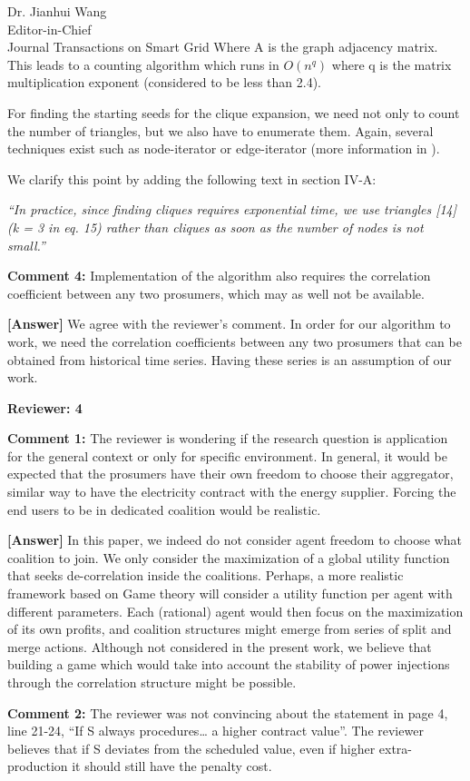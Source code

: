 \documentclass{letter}
\begin{document}
\begin{letter}{Dr. Jianhui Wang \\ Editor-in-Chief \\ Journal Transactions on Smart Grid }
Where A is the graph adjacency matrix. This leads to a counting algorithm which runs in $ O(n^q) $ where q is the matrix multiplication exponent (considered to be less than 2.4).

For finding the starting seeds for the clique expansion, we need not only to count the number of triangles, but we also have to enumerate them. Again, several techniques exist such as node-iterator or edge-iterator (more information in \cite{Schank2001}). 

We clarify this point by adding the following text in section IV-A:

\textit{“In practice, since finding cliques requires exponential time, we use triangles [14] (k = 3 in eq. 15) rather than cliques as soon as the number of nodes is not small.” }


\textbf{Comment 4:} Implementation of the algorithm also requires the correlation coefficient between any two prosumers, which may as well not be available.


\textbf{[Answer]} We agree with the reviewer’s comment. In order for our algorithm to work, we need the correlation coefficients between any two prosumers that can be obtained from historical time series. Having these series is an assumption of our work.


\textbf{Reviewer: 4}

\textbf{Comment 1:} The reviewer is wondering if the research question is application for the general context or only for specific environment. In general, it would be expected that the prosumers have their own freedom to choose their aggregator, similar way to have the electricity contract with the energy supplier. Forcing the end users to be in dedicated coalition would be realistic.


\textbf{[Answer]} In this paper, we indeed do not consider agent freedom to choose what coalition to join. We only consider the maximization of a global utility function that seeks de-correlation inside the coalitions. Perhaps, a more realistic framework based on Game theory will consider a utility function per agent with different parameters. Each (rational) agent would then focus on the maximization of its own profits, and coalition structures might emerge from series of split and merge actions. Although not considered in the present work, we believe that building a game which would take into account the stability of power injections through the correlation structure might be possible.


\textbf{Comment 2:} The reviewer was not convincing about the statement in page 4, line 21-24, “If S always procedures… a higher contract value”. The reviewer believes that if S deviates from the scheduled value, even if higher extra-production it should still have the penalty cost.



\end{letter}
\end{document}
